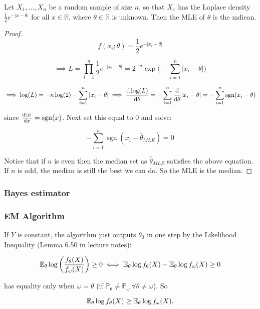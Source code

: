 \begin{proposition}
Let $X_{1},\ldots,X_{n}$ be a random sample of size $n$, so that $X_{1}$ has the Laplace density $\frac{1}{2}e^{-|x-\theta|}$ for all $x\in\mathbb{R}$, where $\theta\in\mathbb{R}$ is unknown. Then the MLE of $\theta$ is the mdiean.
\end{proposition}

\begin{proof}

\[
f(x_i; \theta) = \frac{1}{2}e^{-|x_i-\theta|}
\]

\[
\implies L = \prod_{i=1}^n  \frac{1}{2}e^{-|x_i-\theta|} = 2^{-n}  \exp \bigg(- \sum_{i=1}^n  |x_i-\theta|\bigg)
\]

\[
\implies \log(L) = -n \log (2) - \sum_{i=1}^n  |x_i-\theta|  \implies  \deriv{\log(L)}{\theta} = - \sum_{i=1}^n  \deriv{}{\theta} |x_i-\theta| = - \sum_{i=1}^n \operatorname{sgn} (x_i-\theta)
\]

since  \(\deriv{|x|}{x} =  \operatorname{sgn}(x)\). Next set this equal to 0 and solve:

\[
 - \sum_{i=1}^n \operatorname{sgn} (x_i-\hat{\theta}_{MLE}) = 0 
 \]
 
Notice that if \(n\) is even then the median set as \(\hat{\theta}_{MLE}\) satisfies the above equation. If \(n\) is odd, the median is still the best we can do. So the MLE is the median.

%
%
%


\end{proof}

\subsubsection{Bayes estimator}

\subsubsection{EM Algorithm}\label{mathstats.sec.em.alg}

\begin{remark}If \(Y\) is constant, the algorithm just outputs \(\theta_0\) in one step by the Likelihood Inequality (Lemma 6.50 in lecture notes):

\[
\E_\theta  \log \left( \frac{f_\theta(X) }{f_{\omega}(X) }  \right) \geq 0 \iff \E_\theta \log f_\theta(X) - \E_\theta \log f_\omega(X) \geq 0
\]

has equality only when \(\omega = \theta\) (if \(\mathbb{P}_\theta \neq \mathbb{P}_\omega \ \forall \theta \neq \omega\)). So

\[
\E_\theta \log f_\theta(X) \geq \E_\theta \log f_\omega(X).
\]

\end{remark}

